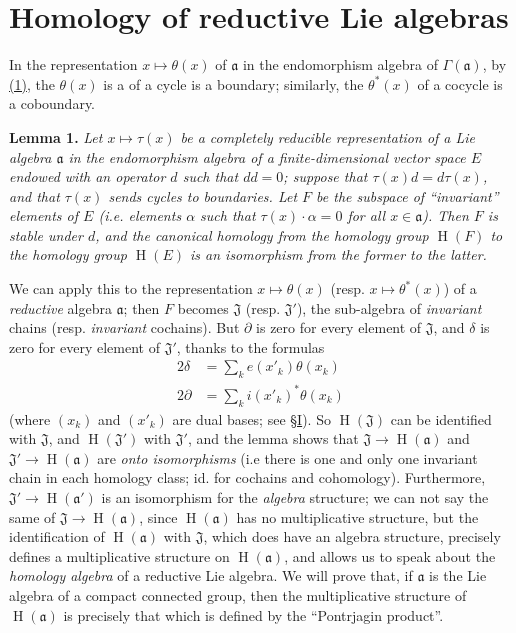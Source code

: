 \documentclass{article}
\newcommand{\fk}{\mathfrak}
\DeclareMathOperator{\HH}{H}
\newcommand{\oldpage}[1]{\marginpar{\footnotesize$\Big\vert$ \textit{p.~#1}}}
\begin{document}
\section{Homology of reductive Lie algebras}
\label{II.4}

In the representation $x\mapsto\theta(x)$ of $\fk{a}$ in the endomorphism algebra of $\Gamma(\fk{a})$, by \hyperref[equation-II.1]{(1)}, the $\theta(x)$ is a of a cycle is a boundary;
similarly, the $\theta^*(x)$ of a cocycle is a coboundary.

\medskip
\textbf{Lemma 1.}
{\itshape
  Let $x\mapsto\tau(x)$ be a completely reducible representation of a Lie algebra $\fk{a}$ in the endomorphism algebra of a finite-dimensional vector space $E$ endowed with an operator $d$ such that $dd=0$;
  suppose that $\tau(x)d=d\tau(x)$, and that $\tau(x)$ sends cycles to boundaries.
  Let $F$ be the subspace of ``invariant'' elements of $E$ (i.e. elements $\alpha$ such that $\tau(x)\cdot\alpha=0$ for all $x\in\fk{a}$).
  Then $F$ is stable under $d$, and the canonical homology from the homology group $\HH(F)$ to the homology group $\HH(E)$ is an \emph{isomorphism} from the former to the latter.
}
\medskip

We can apply this to the representation $x\mapsto\theta(x)$ (resp. $x\mapsto\theta^*(x)$) of a \emph{reductive} algebra $\fk{a}$;
then $F$ becomes $\fk{J}$ (resp. $\fk{J}'$), the sub-algebra of \emph{invariant} chains (resp. \emph{invariant} cochains).
But $\partial$ is zero for every element of $\fk{J}$, and $\delta$ is zero for every element of $\fk{J}'$, thanks to the formulas
\[
  \begin{aligned}
    2\delta
    &= \sum_k e(x'_k)\theta(x_k)
  \\2\partial
    &= \sum_k i(x'_k)^*\theta(x_k)
  \end{aligned}
\]
(where $(x_k)$ and $(x'_k)$ are dual bases; see \hyperref[I]{\S I}).
So $\HH(\fk{J})$ can be identified with $\fk{J}$,
and
\oldpage{48}
$\HH(\fk{J}')$ with $\fk{J}'$, and the lemma shows that $\fk{J}\to\HH(\fk{a})$ and $\fk{J}'\to\HH(\fk{a})$ are \emph{onto isomorphisms} (i.e there is one and only one invariant chain in each homology class; id. for cochains and cohomology).
Furthermore, $\fk{J}'\to\HH(\fk{a}')$ is an isomorphism for the \emph{algebra} structure;
we can not say the same of $\fk{J}\to\HH(\fk{a})$, since $\HH(\fk{a})$ has no multiplicative structure, but the identification of $\HH(\fk{a})$ with $\fk{J}$, which does have an algebra structure, precisely defines a multiplicative structure on $\HH(\fk{a})$, and allows us to speak about the \emph{homology algebra} of a reductive Lie algebra.
We will prove that, if $\fk{a}$ is the Lie algebra of a compact connected group, then the multiplicative structure of $\HH(\fk{a})$ is precisely that which is defined by the ``Pontrjagin product''.
\end{document}
